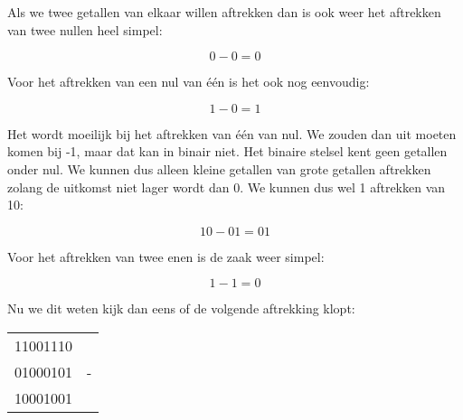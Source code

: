 Als we twee getallen van elkaar willen aftrekken dan is ook weer het aftrekken van twee nullen heel simpel:

\[ 0 - 0 = 0 \]

Voor het aftrekken van een nul van \'e\'en is het ook nog eenvoudig:

\[ 1 - 0 = 1 \]

Het wordt moeilijk bij het aftrekken van \'e\'en van nul. We zouden dan uit moeten komen bij -1, maar dat kan in binair niet. Het binaire stelsel kent geen getallen onder nul. We kunnen dus alleen kleine getallen van grote getallen aftrekken zolang de uitkomst niet lager wordt dan 0. We kunnen dus wel 1 aftrekken van 10:

\[ 10 - 01 = 01 \]

Voor het aftrekken van twee enen is de zaak weer simpel:

\[ 1 - 1 = 0 \]

Nu we dit weten kijk dan eens of de volgende aftrekking klopt:

\begin{center}
\begin{tabular}{ r l }
	11001110 & \\
	01000101 & -\\
	\hline
        10001001 & \\
\end{tabular}
\end{center}

